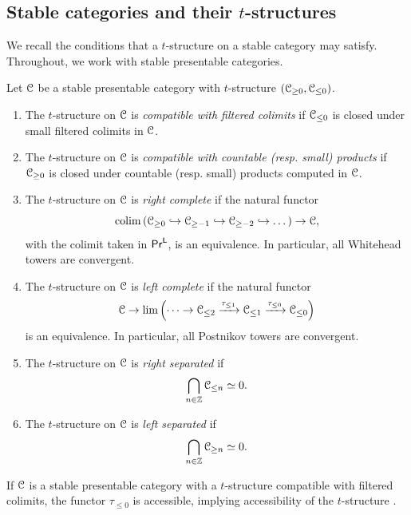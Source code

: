 \subsection{Stable categories and their \texorpdfstring{$t$}{t}-structures}\label{subsec: t-structures}
We recall the conditions that a $t$-structure on a stable category may satisfy. Throughout, we work with stable presentable categories. 
\begin{definition}\label{def: t-structure adjectives}
    Let $\EuScript{C}$ be a stable presentable category with $t$-structure $(\EuScript{C}_{\geq0},\EuScript{C}_{\leq0})$. 
    \begin{enumerate}
        \item The $t$-structure on $\EuScript{C}$ is \emph{compatible with filtered colimits} if $\EuScript{C}_{\leq0}$ is closed under small filtered colimits in $\EuScript{C}$. 
        \item The $t$-structure on $\EuScript{C}$ is \emph{compatible with countable (resp. small) products} if $\EuScript{C}_{\geq0}$ is closed under countable (resp. small) products computed in $\EuScript{C}$.
        \item The $t$-structure on $\EuScript{C}$ is \emph{right complete} if the natural functor 
        $$\operatorname*{colim}\left(\EuScript{C}_{\geq0}\hookrightarrow\EuScript{C}_{\geq-1}\hookrightarrow\EuScript{C}_{\geq-2}\hookrightarrow\dots\right)\to\EuScript{C},$$
        with the colimit taken in $\mathsf{Pr}^{\mathsf{L}}$, is an equivalence. In particular, all Whitehead towers are convergent.  
        \item The $t$-structure on $\EuScript{C}$ is \emph{left complete} if the natural functor 
        $$\EuScript{C}\to\lim\left(\dots\to\EuScript{C}_{\leq2}\xrightarrow{\tau_{\leq 1}}\EuScript{C}_{\leq 1}\xrightarrow{\tau_{\leq0}}\EuScript{C}_{\leq0}\right)$$
        is an equivalence. In particular, all Postnikov towers are convergent. 
        \item The $t$-structure on $\EuScript{C}$ is \emph{right separated} if 
        $$\bigcap_{n\in \mathbb{Z}}\EuScript{C}_{\leq n}\simeq0.$$
        \item The $t$-structure on $\EuScript{C}$ is \emph{left separated} if 
        $$\bigcap_{n\in\mathbb{Z}}\EuScript{C}_{\geq n}\simeq0.$$
    \end{enumerate}
\end{definition}
\begin{remark}\label{rmk: filtered colimits implies accessible}
    If $\EuScript{C}$ is a stable presentable category with a $t$-structure compatible with filtered colimits, the functor $\tau_{\leq0}$ is accessible, implying accessibility of the $t$-structure \cite[Prop. 1.4.4.13]{HA}. 
\end{remark}
